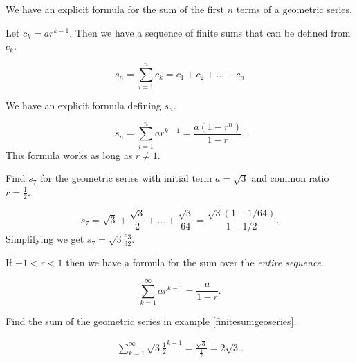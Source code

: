 We have an explicit formula for the sum of the first \(n\) terms of a geometric series.

Let \(c_k = ar^{k-1}.\) Then we have a sequence of finite sums that can be defined from \(c_k.\)

\[s_n = \sum_{i=1}^{n}c_k = c_1+c_2 +\dots+c_n\]

We have an explicit formula defining \(s_n.\)

\[s_n = \sum_{i=1}^nar^{k-1} = \frac{a\left(1-r^n\right)}{1-r}.\] This formula works as long as \(r \ne 1.\)

\begin{example} \label{finitesumgeoseries}
    Find \(s_7\) for the geometric series with initial term \(a = \sqrt{3}\) and common ratio \(r=\frac{1}{2}.\)
    \begin{solution}
        \[s_7 = \sqrt{3} + \frac{\sqrt{3}}{2}+\dots +\frac{\sqrt{3}}{64} = \frac{\sqrt{3}\left(1-1/64\right)}{1-1/2}.\]
        Simplifying we get \(s_7 = \sqrt{3}\frac{63}{32}.\)
    \end{solution}
\end{example}

If \(-1< r < 1\) then we have a formula for the sum over the \emph{entire sequence}.

\[\sum_{k=1}^{\infty}ar^{k-1} = \frac{a}{1-r}.\]

\begin{example}
    Find the sum of the geometric series in example \ref{finitesumgeoseries}.
    \begin{solution}
        \begin{gather*}\sum_{k=1}^{\infty}\sqrt{3}\frac{1}{2}^{k-1} = \frac{\sqrt{3}}{\frac{1}{2}} = 2\sqrt{3}. \end{gather*}
    \end{solution}
\end{example}